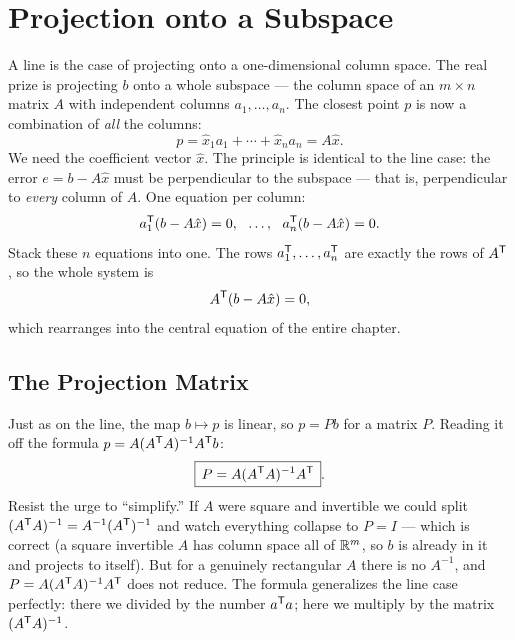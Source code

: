 \section{Projection onto a Subspace}

A line is the case of projecting onto a one-dimensional column space. The real prize is projecting $b$ onto a whole subspace --- the column space of an $m\times n$ matrix $A$ with independent columns $a_1,\dots,a_n$. The closest point $p$ is now a combination of \emph{all} the columns:
\[
   p = \hat x_1 a_1 + \cdots + \hat x_n a_n = A\hat x .
\]
We need the coefficient vector $\hat x$. The principle is identical to the line case: the error $e = b - A\hat x$ must be perpendicular to the subspace --- that is, perpendicular to \emph{every} column of $A$. One equation per column:
\[
   a_1^{\mathsf T} (b - A\hat x) = 0,\ \ \dots,\ \ a_n^{\mathsf T} (b - A\hat x) = 0 .
\]
Stack these $n$ equations into one. The rows $a_1^{\mathsf T},\dots,a_n^{\mathsf T}$ are exactly the rows of $A^{\mathsf T}$, so the whole system is
\[
   A^{\mathsf T} (b - A\hat x) = 0 ,
\]
which rearranges into the central equation of the entire chapter.



\subsection{The Projection Matrix}

Just as on the line, the map $b\mapsto p$ is linear, so $p = Pb$ for a matrix $P$. Reading it off the formula $p = A(A^{\mathsf T} A)^{-1}A^{\mathsf T} b$:
\[
   \boxed{\,P = A(A^{\mathsf T} A)^{-1}A^{\mathsf T}\,}.
\]
Resist the urge to ``simplify.'' If $A$ were square and invertible we could split $(A^{\mathsf T} A)^{-1}=A^{-1}(A^{\mathsf T})^{-1}$ and watch everything collapse to $P=I$ --- which is correct (a square invertible $A$ has column space all of $\mathbb{R}^m$, so $b$ is already in it and projects to itself). But for a genuinely rectangular $A$ there is no $A^{-1}$, and $P=A(A^{\mathsf T} A)^{-1}A^{\mathsf T}$ does not reduce. The formula generalizes the line case perfectly: there we divided by the number $a^{\mathsf T} a$; here we multiply by the matrix $(A^{\mathsf T} A)^{-1}$.

